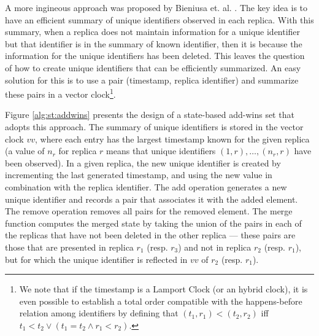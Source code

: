 \documentclass[11pt,a4paper]{article}
\begin{document}
A more ingineous approach was proposed by Bieniusa et. al. \cite{Bieniusa12Optimized}.
The key idea is to have an efficient summary of unique identifiers observed
in each replica. With this summary, when a replica does not maintain information
for a unique identifier but that identifier is in the summary of known identifier,
then it is because the information for the unique identifiers has been deleted.
This leaves the question of how to create unique identifiers that can be 
efficiently summarized. 
An easy solution for this is to use a pair (timestamp, replica identifier)
and summarize these pairs in a vector clock\footnote{We note that if the 
timestamp is a Lamport Clock \cite{Lamport78Time} (or an 
hybrid clock), it is even possible to establish a total order compatible with 
the happens-before relation among identifiers by defining that $(t_1,r_1) < (t_2,r_2)$
iff $t_1 < t_2 \vee ( t_1 = t_2 \wedge r_1 < r_2)$.}.

Figure \ref{alg:st:addwins} presents the design of a state-based add-wins
set that adopts this approach. 
The summary of unique identifiers is stored in the vector clock $vv$, where
each entry has the largest timestamp known for the given replica (a value of 
$n_r$ for replica $r$ means that unique identifiers $(1,r),\ldots,(n_r,r)$ have been
observed).
In a given replica, the new unique identifier is created by incrementing the last
generated timestamp, and using the new value in combination with the replica identifier.
The add operation generates a new unique identifier and records a pair that
associates it with the added element.
The remove operation removes all pairs for the removed element.
The merge function computes the merged state by taking the union of the pairs
in each of the replicas that have not been deleted in the other replica --- these
pairs are those that are presented in replica $r_1$ (resp. $r_3$) and not in 
replica $r_2$ (resp. $r_1$), but for which the
unique identifier is reflected in $vv$ of $r_2$ (resp. $r_1$).
\end{document}
